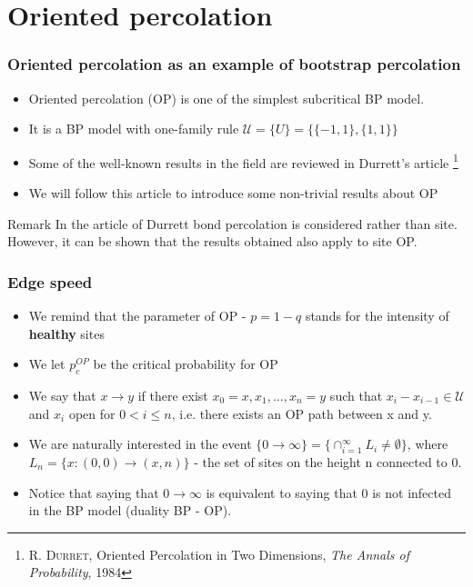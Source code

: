 
\section{Oriented percolation}

\begin{frame}
	\frametitle{Oriented percolation as an example of  bootstrap percolation}
	
\begin{itemize}
\item Oriented percolation (OP) is one of the simplest subcritical BP model.
\item It is a BP model with one-family rule $\mathcal{U} = \{U\} = \{\{-1, 1\}, \{1, 1\}\}$
\item Some of the well-known results in the field are reviewed in Durrett's article \footnote{R. \textsc{Durret}, Oriented Percolation in Two Dimensions, \emph{The Annals of Probability}, 1984}
\item We will follow this article to introduce some non-trivial results about OP
\end{itemize}

\begin{alertblock}{Remark}
	In the article of Durrett bond percolation is considered rather than site. However, it can be shown that the results obtained also apply to site OP.
\end{alertblock}

\end{frame}

\begin{frame}
	\frametitle{Edge speed}
	\begin{itemize}
		\item We remind that the parameter of OP - $p = 1 - q$ stands for the intensity of \textbf{healthy} sites
		\item We let $p_{c}^{OP}$ be the critical probability for OP
		\item We say that $x \rightarrow y$  if there exist $x_{0} = x, x_{1}, \ldots, x_{n} = y$ such that $x_{i} - x_{i - 1} \in \mathcal{U}$ and $x_{i}$ open for $0 < i \leq n$, i.e. there exists an OP path between x and y.
		\item We are naturally interested in the event $\{0 \rightarrow \infty \} = \{ \cap_{i = 1}^{\infty} L_{i} \neq \emptyset \}$, where $L_{n} = \{x: (0, 0) \rightarrow (x, n) \}$ - the set of sites on the height n connected to 0.
		\item Notice that saying that $0 \rightarrow \infty$ is equivalent to saying that 0 is not infected in the BP model (duality BP - OP).
	\end{itemize}
\end{frame}
	
